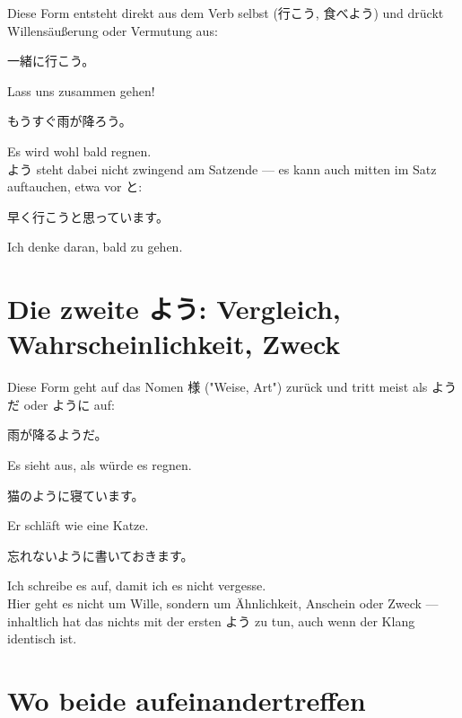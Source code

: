 \documentclass[12pt]{book}
\begin{document}
Diese Form entsteht direkt aus dem Verb selbst (行こう, 食べよう) und drückt Willensäußerung oder Vermutung aus:

\par\quad 一緒に行こう。\\
\par\quad Lass uns zusammen gehen!\\

\par\quad もうすぐ雨が降ろう。\\
\par\quad Es wird wohl bald regnen.\\

よう steht dabei nicht zwingend am Satzende — es kann auch mitten im Satz auftauchen, etwa vor と:

\par\quad 早く行こうと思っています。\\
\par\quad Ich denke daran, bald zu gehen.\\

\section*{Die zweite よう: Vergleich, Wahrscheinlichkeit, Zweck}

Diese Form geht auf das Nomen 様 ("Weise, Art") zurück und tritt meist als ようだ oder ように auf:

\par\quad 雨が降るようだ。\\
\par\quad Es sieht aus, als würde es regnen.\\

\par\quad 猫のように寝ています。\\
\par\quad Er schläft wie eine Katze.\\

\par\quad 忘れないように書いておきます。\\
\par\quad Ich schreibe es auf, damit ich es nicht vergesse.\\

Hier geht es nicht um Wille, sondern um Ähnlichkeit, Anschein oder Zweck — inhaltlich hat das nichts mit der ersten よう zu tun, auch wenn der Klang identisch ist.

\section*{Wo beide aufeinandertreffen}
\end{document}
